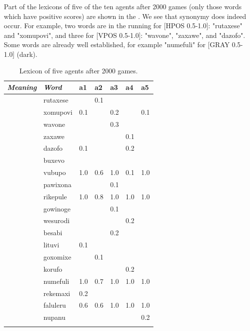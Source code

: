 Part of the lexicons of five of the ten agents after 2000 games 
(only those words which have positive scores) are shown in the 
. We see that synonymy does indeed occur. For
example, two words are in the 
running for [HPOS 0.5-1.0]: "rutaxese" and "xomupovi", and 
three for [VPOS 0.5-1.0]: "wavone", "zaxawe", and 
"dazofo". Some words are already well established, for
example "numefuli" for [GRAY 0.5-1.0] (dark). 
\begin{table}
\begin{center}
\begin{tabular}{ l  l  l  l  l  l  l  }
\lsptoprule
{\it Meaning}&{\it Word}&{\bf a1}&{\bf a2}&{\bf a3}&{\bf a4}&{\bf a5} \\ \midrule
[HPOS 0.5-1.0]&rutaxese& &0.1& & &\\ \midrule
 & xomupovi&0.1& &0.2& &0.1\\ \midrule
[VPOS 0.5-1.0]&wavone& & &0.3& &\\ \midrule
 & zaxawe& & & &0.1& \\ \midrule
 & dazofo&0.1& & &0.2&\\ \midrule
[WIDTH 0.0-0.5]&buxevo& & & & & \\ \midrule
 & vubupo&1.0&0.6&1.0&0.1&1.0\\ \midrule
[WIDTH 0.5-1.0]&pawixona& & &0.1& & \\ \midrule
 & rikepule&1.0&0.8&1.0&1.0&1.0\\ \midrule
[WIDTH 0.5-0.75]&gowinoge& & &0.1& &  \\ \midrule
 & wesurodi& & & &0.2&\\ \midrule
[WIDTH 0.75-1.0]&besabi& & &0.2& & \\ \midrule
 & lituvi&0.1& & & & \\ \midrule
[GRAY 0.5-0.75]&goxomixe& &0.1& & & \\ \midrule
 & korufo& & & &0.2&\\ \midrule
[GRAY 0.0-0.5]&numefuli&1.0&0.7&1.0&1.0&1.0\\ \midrule
[GRAY 0.0-0.25]&rekemaxi&0.2& & & & \\ \midrule
[GRAY 0.5-1.0]&faluleru&0.6&0.6&1.0&1.0&1.0\\ \midrule
 & nupanu& & & & &0.2 \\ \midrule
\lspbottomrule
\end{tabular}
\caption{\label{tab:lex2000} Lexicon of five agents after 2000 games.}
\end{center}
\end{table}

